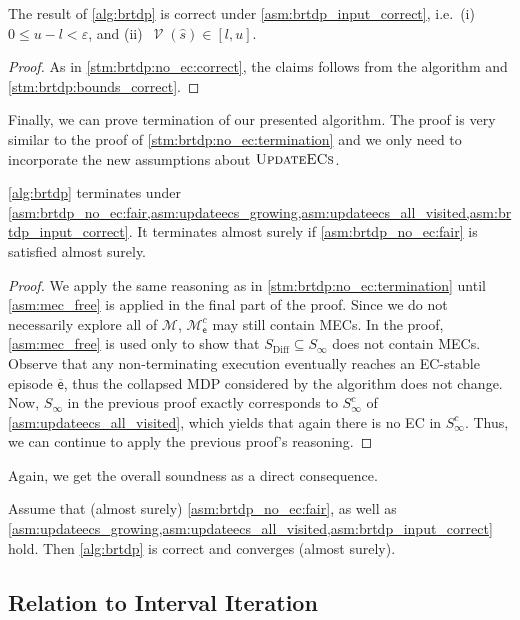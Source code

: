 \documentclass{theoretics}
\newcommand{\MDP}{\mathcal{M}}
\newcommand{\States}{S}
\newcommand{\initialstate}{\hat{s}}
\DeclareMathOperator{\val}{\mathcal{V}}
\newcommand{\bounddifference}{\mathrm{Diff}}
\newcommand{\updateecs}{\textsc{UpdateECs}}
\newcommand{\algoepisode}{\mathsf{e}}
\begin{document}
\begin{lemma} \label{stm:brtdp:correct}
	The result of \cref{alg:brtdp} is correct under \cref{asm:brtdp_input_correct}, i.e.\ (i)~$0 \leq u - l < \varepsilon$, and (ii)~$\val(\initialstate) \in [l, u]$.
\end{lemma}

\begin{proof}
	As in \cref{stm:brtdp:no_ec:correct}, the claims follows from the algorithm and \cref{stm:brtdp:bounds_correct}. 
\end{proof}

Finally, we can prove termination of our presented algorithm.
The proof is very similar to the proof of \cref{stm:brtdp:no_ec:termination} and we only need to incorporate the new assumptions about $\updateecs$.

\begin{lemma} \label{stm:brtdp:terminates}
	\cref{alg:brtdp} terminates under \cref{asm:brtdp_no_ec:fair,asm:updateecs_growing,asm:updateecs_all_visited,asm:brtdp_input_correct}.
	It terminates almost surely if \cref{asm:brtdp_no_ec:fair} is satisfied almost surely.
\end{lemma}

\begin{proof}
	We apply the same reasoning as in \cref{stm:brtdp:no_ec:termination} until \cref{asm:mec_free} is applied in the final part of the proof.
	Since we do not necessarily explore all of $\MDP$, $\MDP^c_\algoepisode$ may still contain MECs.
	In the proof, \cref{asm:mec_free} is used only to show that $\States_\bounddifference \subseteq \States_\infty$ does not contain MECs.
	Observe that any non-terminating execution eventually reaches an EC-stable episode $\overline{\algoepisode}$, thus the collapsed MDP considered by the algorithm does not change.
	Now, $\States_\infty$ in the previous proof exactly corresponds to $\States_\infty^c$ of \cref{asm:updateecs_all_visited}, which yields that again there is no EC in $\States_\infty^c$.
	Thus, we can continue to apply the previous proof's reasoning. 
\end{proof}
Again, we get the overall soundness as a direct consequence.
\begin{theorem}
	Assume that (almost surely) \cref{asm:brtdp_no_ec:fair}, as well as \cref{asm:updateecs_growing,asm:updateecs_all_visited,asm:brtdp_input_correct} hold.
	Then \cref{alg:brtdp} is correct and converges (almost surely).
\end{theorem}

\subsection{Relation to Interval Iteration}
\end{document}
